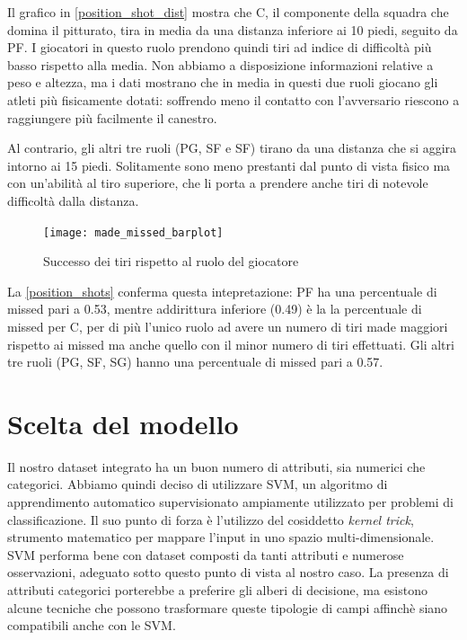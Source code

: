 Il grafico in \autoref{position_shot_dist} mostra che C, il componente della squadra che domina il pitturato, tira in media da una distanza inferiore ai 10 piedi, seguito da PF. I giocatori in questo ruolo prendono quindi tiri ad indice di difficoltà più basso rispetto alla media.
Non abbiamo a disposizione informazioni relative a peso e altezza, ma i dati \cite{basketball-reference} mostrano che in media in questi due ruoli giocano gli atleti più fisicamente dotati: soffrendo meno il contatto con l'avversario riescono a raggiungere più facilmente il canestro.

Al contrario, gli altri tre ruoli (PG, SF e SF) tirano da una distanza che si aggira intorno ai 15 piedi. Solitamente sono meno prestanti dal punto di vista fisico ma con un'abilità al tiro superiore, che li porta a prendere anche tiri di notevole difficoltà dalla distanza.

\begin{figure}
\caption{Successo dei tiri rispetto al ruolo del giocatore}
\label{position_shots}
\texttt{[image: made\_missed\_barplot]}
\end{figure}

La \autoref{position_shots} conferma questa intepretazione: PF ha una percentuale di missed pari a 0.53, mentre addirittura inferiore (0.49) è la la percentuale di missed per C, per di più l'unico ruolo ad avere un numero di tiri made maggiori rispetto ai missed ma anche quello con il minor numero di tiri effettuati.
Gli altri tre ruoli (PG, SF, SG) hanno una percentuale di missed pari a 0.57.

\section{Scelta del modello}

Il nostro dataset integrato ha un buon numero di attributi, sia numerici che categorici.
Abbiamo quindi deciso di utilizzare SVM, un algoritmo di apprendimento automatico supervisionato ampiamente utilizzato per problemi di classificazione. Il suo punto di forza è l'utilizzo del cosiddetto \textit{kernel trick}, strumento matematico per mappare l'input in uno spazio multi-dimensionale. SVM performa bene con dataset composti da tanti attributi e numerose osservazioni, adeguato sotto questo punto di vista al nostro caso.
La presenza di attributi categorici porterebbe a preferire gli alberi di decisione, ma esistono alcune tecniche che possono trasformare queste tipologie di campi affinchè siano compatibili anche con le SVM.